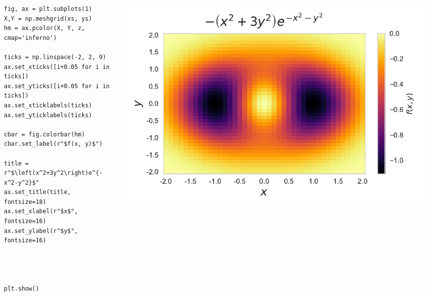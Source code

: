 \documentclass{beamer}
\begin{document}
\begin{frame}[fragile]
\tiny{
\begin{columns}
\begin{column}{0.45\textwidth}
\begin{verbatim}
fig, ax = plt.subplots(1)
X,Y = np.meshgrid(xs, ys)
hm = ax.pcolor(X, Y, z, cmap='inferno')

ticks = np.linspace(-2, 2, 9)
ax.set_xticks([i+0.05 for i in ticks])
ax.set_yticks([i+0.05 for i in ticks])
ax.set_xticklabels(ticks)
ax.set_yticklabels(ticks)

cbar = fig.colorbar(hm)
cbar.set_label(r"$f(x, y)$")

title = r"$\left(x^2+3y^2\right)e^{-x^2-y^2}$"
ax.set_title(title, fontsize=18)
ax.set_xlabel(r"$x$", fontsize=16)
ax.set_ylabel(r"$y$", fontsize=16)




plt.show()
\end{verbatim}
\end{column}
\begin{column}{0.55\textwidth}
\includegraphics[width=\textwidth]{../heatmap_6.pdf}
\end{column}
\end{columns}
}
\end{frame}
\end{document}
